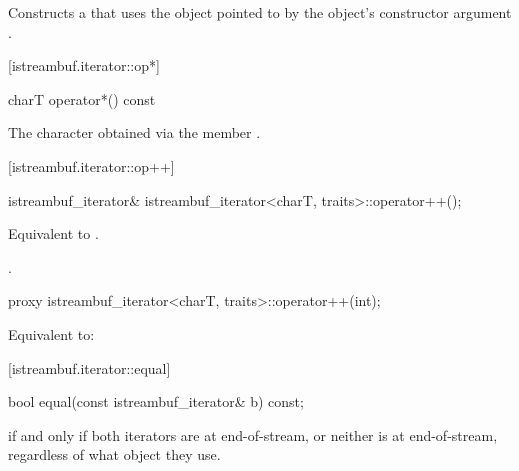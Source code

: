 \begin{itemdescr}
\pnum
\effects
Constructs a
that uses the
object pointed to by the
object's constructor argument .
\end{itemdescr}

[istreambuf.iterator::op*]{}

%
\begin{itemdecl}
charT operator*() const
\end{itemdecl}

\begin{itemdescr}
\pnum
\returns
The character obtained via the
member
.
\end{itemdescr}

[istreambuf.iterator::op++]{}

%
\begin{itemdecl}
istreambuf_iterator&
    istreambuf_iterator<charT, traits>::operator++();
\end{itemdecl}

\begin{itemdescr}
\pnum
\effects Equivalent to
.

\pnum
\returns
{}.
\end{itemdescr}

%
%
\begin{itemdecl}
proxy istreambuf_iterator<charT, traits>::operator++(int);
\end{itemdecl}

\begin{itemdescr}
\pnum
\effects Equivalent to:
\end{itemdescr}

[istreambuf.iterator::equal]{}

%
\begin{itemdecl}
bool equal(const istreambuf_iterator& b) const;
\end{itemdecl}

\begin{itemdescr}
\pnum
\returns
{}
if and only if both iterators are at end-of-stream,
or neither is at end-of-stream, regardless of what
object they use.
\end{itemdescr}

